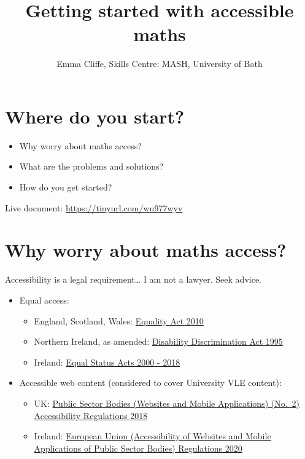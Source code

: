 \documentclass[
  10pt,
  a4paper]{article}
\title{Getting started with accessible maths}
\author{Emma Cliffe, Skills Centre: MASH, University of Bath}
\date{}
\providecommand{\tightlist}{%
  \setlength{\itemsep}{0pt}\setlength{\parskip}{0pt}}
\theoremstyle{plain}
\theoremstyle{plain}
\theoremstyle{plain}
\theoremstyle{plain}
\theoremstyle{plain}
\theoremstyle{definition}
\theoremstyle{definition}
\theoremstyle{definition}
\theoremstyle{remark}
\begin{document}
\maketitle

{
\setcounter{tocdepth}{2}
\tableofcontents
}
\newpage
{}

\hypertarget{where-do-you-start}{%
\section*{Where do you start?}\label{where-do-you-start}}

\begin{itemize}
\tightlist
\item
  Why worry about maths access?
\item
  What are the problems and solutions?
\item
  How do you get started?
\end{itemize}

Live document: \url{https://tinyurl.com/wu977wyv}

\hypertarget{why-worry-about-maths-access}{%
\section{Why worry about maths access?}\label{why-worry-about-maths-access}}

Accessibility is a legal requirement\ldots{} I am not a lawyer. Seek advice.

\begin{itemize}
\tightlist
\item
  Equal access:

  \begin{itemize}
  \tightlist
  \item
    England, Scotland, Wales: \href{https://www.legislation.gov.uk/ukpga/2010/15/contents}{Equality Act 2010}
  \item
    Northern Ireland, as amended: \href{http://www.niassembly.gov.uk/globalassets/Documents/RaISe/Publications/2012/ofmdfm/2712.pdf}{Disability Discrimination Act 1995}
  \item
    Ireland: \href{https://www.ihrec.ie/guides-and-tools/human-rights-and-equality-in-the-provision-of-good-and-services/what-does-the-law-say/equal-status-acts/}{Equal Status Acts 2000 - 2018}
  \end{itemize}
\item
  Accessible web content (considered to cover University VLE content):

  \begin{itemize}
  \tightlist
  \item
    UK: \href{https://www.legislation.gov.uk/uksi/2018/852/contents/made}{Public Sector Bodies (Websites and Mobile Applications) (No.~2) Accessibility Regulations 2018}
  \item
    Ireland: \href{https://www.irishstatutebook.ie/eli/2020/si/358/made/en/print}{European Union (Accessibility of Websites and Mobile Applications of Public Sector Bodies) Regulations 2020}
  \end{itemize}
\end{itemize}
\end{document}
